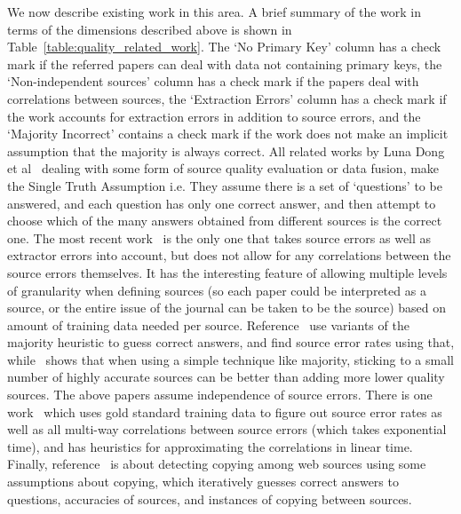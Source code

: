 \documentclass{sig-alternate}
\begin{document}
We now describe existing work in this area. A brief summary of the work in terms of the dimensions described above is shown in Table~\ref{table:quality_related_work}. The `No Primary Key' column has a check mark if the referred papers can deal with data not containing primary keys, the `Non-independent sources' column has a check mark if the papers deal with correlations between sources, the `Extraction Errors' column has a check mark if the work accounts for extraction errors in addition to source errors, and the `Majority Incorrect' contains a check mark if the work does not make an implicit assumption that the majority is always correct. 
All related works by Luna Dong et al~\cite{DBLP:journals/corr/DongGMDHLSZ15,6228170,Pochampally:2014:FDC:2588555.2593674,Dong:2012:LMS:2448936.2448938,Dong:2014:DFK:2732951.2732962} dealing with some form of source quality evaluation or data fusion, make the Single Truth Assumption i.e. They assume there is a set of `questions' to be answered, and each question has only one correct answer, and then attempt to choose which of the many answers obtained from different sources is the correct one. The most recent work~\cite{DBLP:journals/corr/DongGMDHLSZ15} is the only one that takes source errors as well as extractor errors into account, but does not allow for any correlations between the source errors themselves. It has the interesting feature of allowing multiple levels of granularity when defining sources (so each paper could be interpreted as a source, or the entire issue of the journal can be taken to be the source) based on amount of training data needed per source. Reference~\cite{Dong:2014:DFK:2732951.2732962} use variants of the majority heuristic to guess correct answers, and find source error rates using that, while~\cite{Dong:2012:LMS:2448936.2448938} shows that when using a simple technique like majority, sticking to a small number of highly accurate sources can be better than adding more lower quality sources. The above papers assume independence of source errors. There is one work~\cite{Pochampally:2014:FDC:2588555.2593674} which uses gold standard training data to figure out source error rates as well as all multi-way correlations between source errors (which takes exponential time), and has heuristics for approximating the correlations in linear time. Finally, reference~\cite{6228170} is about detecting copying among web sources using some assumptions about copying, which iteratively guesses correct answers to questions, accuracies of sources, and instances of copying between sources. 
\end{document}

